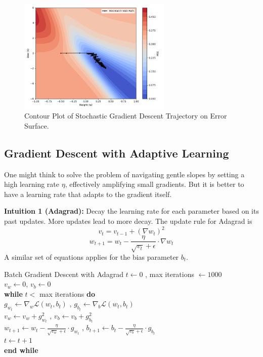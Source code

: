 \begin{figure}[h!]
    \centering
    \includegraphics[width=0.65\textwidth]{content/section01/chapter01/figs/sgd_contour.png}
    \caption{Contour Plot of Stochastic Gradient Descent Trajectory on Error Surface.}
\end{figure}


\subsection{Gradient Descent with Adaptive Learning}

One might think to solve the problem of navigating gentle slopes by setting a high learning rate \( \eta \), effectively amplifying small gradients. But it is better to have a learning rate that adapts to the gradient itself.

\textbf{Intuition 1 (Adagrad):} Decay the learning rate for each parameter based on its past updates. More updates lead to more decay. The update rule for Adagrad is
\[
v_t = v_{t-1} + (\nabla w_t)^2
\]
\[
w_{t+1} = w_t - \frac{\eta}{\sqrt{v_t} + \epsilon} \cdot \nabla w_t
\]
A similar set of equations applies for the bias parameter \( b_t \).

\begin{algobox}{Batch Gradient Descent with Adagrad}
\( t \gets 0 \) , max iterations \( \gets 1000 \) \\
\( v_w \gets 0 \), \( v_b \gets 0 \) \\
\textbf{while} \( t < \) max iterations \textbf{do} \\
\hspace*{1em} \( g_{w_t} \gets \nabla_w \mathcal{L}(w_t, b_t) \) , \quad \( g_{b_t} \gets \nabla_b \mathcal{L}(w_t, b_t) \) \\
\hspace*{1em} \( v_w \gets v_w + g_{w_t}^2 \) , \quad \( v_b \gets v_b + g_{b_t}^2 \) \\
\hspace*{1em} \( w_{t+1} \gets w_t - \frac{\eta}{\sqrt{v_w} + \epsilon} \cdot g_{w_t} \) , \quad \( b_{t+1} \gets b_t - \frac{\eta}{\sqrt{v_b} + \epsilon} \cdot g_{b_t} \) \\
\hspace*{1em} \( t \gets t + 1 \) \\
\textbf{end while}
\end{algobox}


